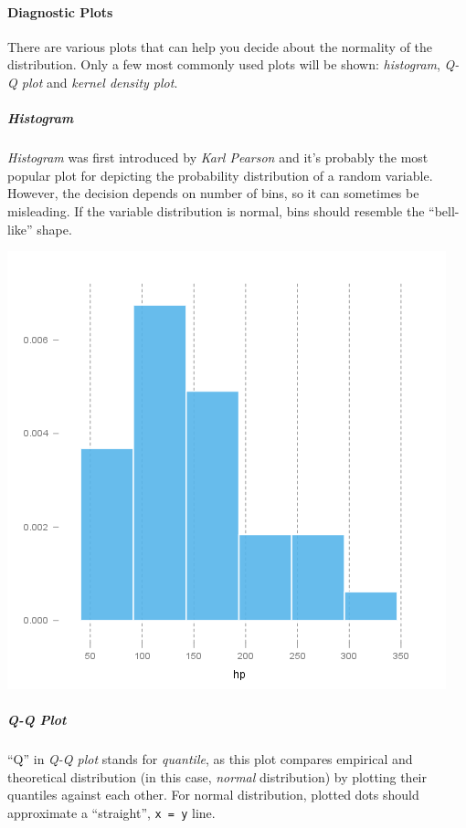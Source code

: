\documentclass[]{article}
\makeatletter
\def\maxwidth{\ifdim\Gin@nat@width>\linewidth\linewidth
\else\Gin@nat@width\fi}
\let\Oldincludegraphics\includegraphics
\renewcommand{\includegraphics}[1]{\Oldincludegraphics[width=\maxwidth]{#1}}
\makeatother
\begin{document}
\paragraph{Diagnostic Plots}

There are various plots that can help you decide about the normality of
the distribution. Only a few most commonly used plots will be shown:
\emph{histogram}, \emph{Q-Q plot} and \emph{kernel density plot}.

\subparagraph{Histogram}

\emph{Histogram} was first introduced by \emph{Karl Pearson} and it's
probably the most popular plot for depicting the probability
distribution of a random variable. However, the decision depends on
number of bins, so it can sometimes be misleading. If the variable
distribution is normal, bins should resemble the ``bell-like'' shape.

\href{78517cde85fc1ba06a3513dd17e567da-hires.png}{\includegraphics{78517cde85fc1ba06a3513dd17e567da.png}}

\subparagraph{Q-Q Plot}

``Q'' in \emph{Q-Q plot} stands for \emph{quantile}, as this plot
compares empirical and theoretical distribution (in this case,
\emph{normal} distribution) by plotting their quantiles against each
other. For normal distribution, plotted dots should approximate a
``straight'', \texttt{x = y} line.
\end{document}
